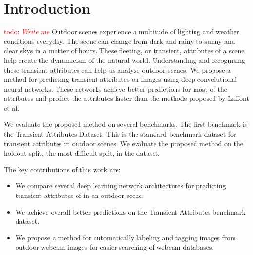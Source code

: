 \documentclass{article}
\newcommand{\todo}[1]{\textcolor{red}{todo: {\em #1}}}
\begin{document}
\section{Introduction}
\todo{Write me}\newline\indent
Outdoor scenes experience a multitude of lighting and weather conditions
everyday.  The scene can change from dark and rainy to sunny and clear 
skys in a matter of hours.  These fleeting, or transient, attributes of
a scene help create the dynamicism of the natural world.  Understanding 
and recognizing these transient attributes can help us analyze outdoor
scenes. We propose a method for predicting transient attributes on images 
using deep convolutional neural networks.  These networks achieve better 
predictions for most of the attributes and predict the attributes
faster than the methods proposed by Laffont\cite{Laffont14} et al.
\newline


We evaluate the proposed method on several benchmarks.  The first 
benchmark is the Transient Attributes Dataset\cite{Laffont14}.  This 
is the standard benchmark dataset for transient attributes in outdoor
scenes.  We evaluate the proposed method on the holdout split, the 
most difficult split, in the dataset.  


The key contributions of this work are:
\begin{itemize}

  \item We compare several deep learning network architectures for
    		predicting transient attributes of in an outdoor scene.

	\item We achieve overall better predictions on the Transient Attributes
				benchmark dataset.

	\item We propose a method for automatically labeling and tagging images
				from outdoor webcam images for easier searching of webcam databases.



\end{itemize}
\end{document}

